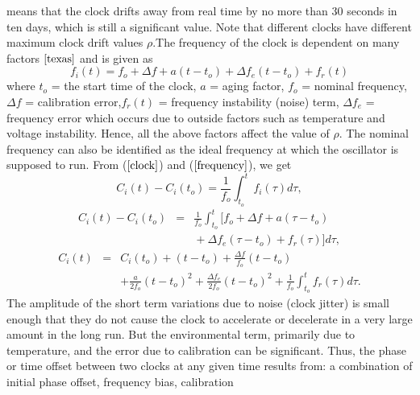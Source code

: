 \documentclass[a4paper,10pt]{report}
\begin{document}
means that the clock drifts away from real time by no more than 30
seconds in ten days, which is still a significant value. Note that
different clocks have different maximum clock drift values
$\rho$.\newline The frequency of the clock is dependent on many
factors $\cite{texas}$ and is given as
\begin{equation}
f_i(t) = f_o + \Delta f + a(t-t_o) + \Delta f_e(t-t_o) + f_r(t)
\label{frequency}
\end{equation}
where \newline $t_o$ = the start time of the clock, \newline $a$ =
aging factor,  \newline $f_o$ = nominal frequency, \newline $\Delta
f$ = calibration error,\newline $f_r(t)$ = frequency instability
(noise) term, \newline $\Delta f_e$ = frequency error which occurs
due to outside factors such as temperature and voltage instability.
\newline Hence, all the above factors affect the value of $\rho$.
The nominal frequency can also be identified as the ideal frequency
at which the oscillator is supposed to run. From ($\ref{clock}$) and
($\ref{frequency}$), we get
\begin{equation}
C_i(t) - C_i(t_o) = \frac{1}{f_o} \int^{t}_{t_o}f_i(\tau)d\tau ,
\end{equation}
\begin{eqnarray*}
C_i(t) - C_i(t_o) & = & \frac{1}{f_o} \int^{t}_{t_o}{[f_o + \Delta f + a(\tau-t_o)  } \\
 &  & {} + \Delta f_e(\tau-t_o) + f_r(\tau)]d\tau ,
\label{fasika}
\end{eqnarray*}
\begin{eqnarray*}
C_i(t) & = & C_i(t_o) + (t-t_o) +\frac{\Delta f}{f_o}(t-t_o) \\
& & + \frac{a}{2f_o}(t-t_o)^2 + \frac{\Delta f_e}{2f_o}(t-t_o)^2 +
\frac{1}{f_o}\int^{t}_{t_o}{f_r(\tau)d\tau} .
\end{eqnarray*}
The amplitude of the short term variations due to noise (clock
jitter) is small enough that they do not cause the clock to
accelerate or decelerate in a very large amount in the long run. But
the environmental term, primarily due to temperature, and the error
due to calibration can be significant. Thus, the phase or time
offset between two clocks at any given time results from: a
combination of initial phase offset, frequency bias, calibration
\end{document}
